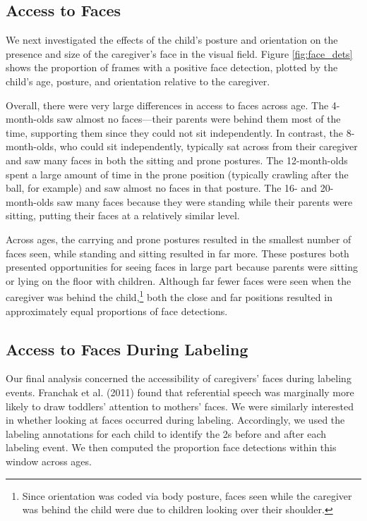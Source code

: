 \documentclass[a4paper,man,apacite,floatsintext,longtable]{apa6}
\begin{document}
\subsection{Access to Faces}\label{access-to-faces}

We next investigated the effects of the child's posture and orientation
on the presence and size of the caregiver's face in the visual field.
Figure \ref{fig:face_dets} shows the proportion of frames with a
positive face detection, plotted by the child's age, posture, and
orientation relative to the caregiver.

Overall, there were very large differences in access to faces across
age. The 4-month-olds saw almost no faces---their parents were behind
them most of the time, supporting them since they could not sit
independently. In contrast, the 8-month-olds, who could sit
independently, typically sat across from their caregiver and saw many
faces in both the sitting and prone postures. The 12-month-olds spent a
large amount of time in the prone position (typically crawling after the
ball, for example) and saw almost no faces in that posture. The 16- and
20-month-olds saw many faces because they were standing while their
parents were sitting, putting their faces at a relatively similar level.

Across ages, the carrying and prone postures resulted in the smallest
number of faces seen, while standing and sitting resulted in far more.
These postures both presented opportunities for seeing faces in large
part because parents were sitting or lying on the floor with children.
Although far fewer faces were seen when the caregiver was behind the
child,\footnote{Since orientation was coded via body posture, faces seen
  while the caregiver was behind the child were due to children looking
  over their shoulder.} both the close and far positions resulted in
approximately equal proportions of face detections.

\subsection{Access to Faces During
Labeling}\label{access-to-faces-during-labeling}

Our final analysis concerned the accessibility of caregivers' faces
during labeling events. Franchak et al. (2011) found that referential
speech was marginally more likely to draw toddlers' attention to
mothers' faces. We were similarly interested in whether looking at faces
occurred during labeling. Accordingly, we used the labeling annotations
for each child to identify the 2s before and after each labeling event.
We then computed the proportion face detections within this window
across ages.
\end{document}
